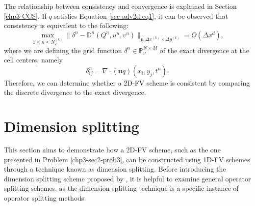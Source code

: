 The relationship between consistency and convergence is explained in Section \ref{chp3-CCS}.
If $q$ satisfies Equation \eqref{sec-adv2d:eq1}, it can be observed that consistency is equivalent to the following:
\begin{equation*}
	{\max_{1\leq n\leq N_T^{(k)}}}{\|\delta^n - \mathbb{D}^n(Q^n,u^n,v^n)\|_{p,\Delta x^{(k)} \times \Delta y^{(k)}}} = O(\Delta x^d),
\end{equation*}
where we are defining the grid function $\delta^n \in \mathbb{P}^{N\times M}_{\nu}$ of the exact divergence at the cell centers, namely
\begin{equation}
\delta^n_{ij} = \nabla \cdot (\boldsymbol{u}q)(x_i,y_j,t^n).
\end{equation}
Therefore, we can determine whether a 2D-FV scheme is consistent by comparing the discrete divergence to the exact divergence.

\section{Dimension splitting}
\label{sec-dsplit}
This section aims to demonstrate how a 2D-FV scheme, such as the one presented in Problem \ref{chp3-sec2-prob3},
can be constructed using 1D-FV schemes through a technique known as dimension splitting.
Before introducing the dimension splitting scheme proposed by \citet{lin:1996},
it is helpful to examine general operator splitting schemes,
as the dimension splitting technique is a specific instance of operator splitting methods.

